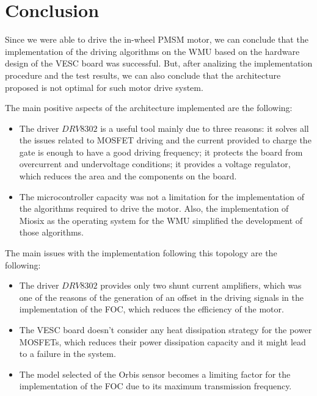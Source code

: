 \chapter{Conclusion} \label{chap:conclusion}

Since we were able to drive the in-wheel \ac{PMSM} motor, we can conclude that the implementation of the driving algorithms on the \ac{WMU} based on the hardware design of the VESC board was successful. But, after analizing the implementation procedure and the test results, we can also conclude that the architecture proposed is not optimal for such motor drive system.

The main positive aspects of the architecture implemented are the following:
\begin{itemize}
	\item The driver $DRV8302$ is a useful tool mainly due to three reasons: it solves all the issues related to \ac{MOSFET} driving and the current provided to charge the gate is enough to have a good driving frequency; it protects the board from overcurrent and undervoltage conditions; it provides a voltage regulator, which reduces the area and the components on the board.
	\item The microcontroller capacity was not a limitation for the implementation of the algorithms required to drive the motor. Also, the implementation of Miosix as the operating system for the \ac{WMU} simplified the development of those algorithms.
\end{itemize}

The main issues with the implementation following this topology are the following:
\begin{itemize}
	\item The driver $DRV8302$ provides only two shunt current amplifiers, which was one of the reasons of the generation of an offset in the driving signals in the implementation of the \ac{FOC}, which reduces the efficiency of the motor.
	\item The VESC board doesn't consider any heat dissipation strategy for the power \ac{MOSFET}s, which reduces their power dissipation capacity and it might lead to a failure in the system.
	\item The model selected of the Orbis sensor becomes a limiting factor for the implementation of the \ac{FOC} due to its maximum transmission frequency.
\end{itemize}

